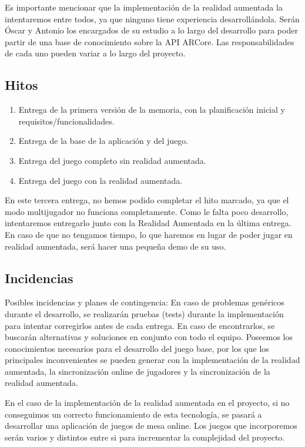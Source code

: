\documentclass[a4paper, openright, 12pt]{article}
\begin{document}
Es importante mencionar que la implementación de la realidad aumentada la intentaremos entre todos, ya que ninguno tiene experiencia desarrollándola. Serán Óscar y Antonio los encargados de su estudio a lo largo del desarrollo para poder partir de una base de conocimiento sobre la API ARCore. Las responsabilidades de cada uno pueden variar a lo largo del proyecto.
\subsection{Hitos}
\begin{enumerate}
    \item Entrega de la primera versión de la memoria, con la planificación inicial y requisitos/funcionalidades.
    \item Entrega de la base de la aplicación y del juego.
    \item Entrega del juego completo sin realidad aumentada.
    \item Entrega del juego con la realidad aumentada.
\end{enumerate}
En este tercera entrega, no hemos podido completar el hito marcado, ya que el modo multijugador no funciona completamente. Como le falta poco desarrollo, intentaremos entregarlo junto con la Realidad Aumentada en la última entrega. En caso de que no tengamos tiempo, lo que haremos en lugar de poder jugar en realidad aumentada, será hacer una pequeña demo de su uso.
\subsection{Incidencias}
Posibles incidencias y planes de contingencia:
En caso de problemas genéricos durante el desarrollo, se realizarán pruebas (tests) durante la implementación para intentar corregirlos antes de cada entrega. En caso de encontrarlos, se buscarán alternativas y soluciones en conjunto con todo el equipo. Poseemos los conocimientos necesarios para el desarrollo del juego base, por los que los principales inconvenientes se pueden generar con la implementación de la realidad aumentada, la sincronización online de jugadores y la sincronización de la realidad aumentada.

En el caso de la implementación de la realidad aumentada en el proyecto, si no conseguimos un correcto funcionamiento de esta tecnología, se pasará a desarrollar una aplicación de juegos de mesa online. Los juegos que incorporemos serán varios y distintos entre si para incrementar la complejidad del proyecto.
\end{document}
